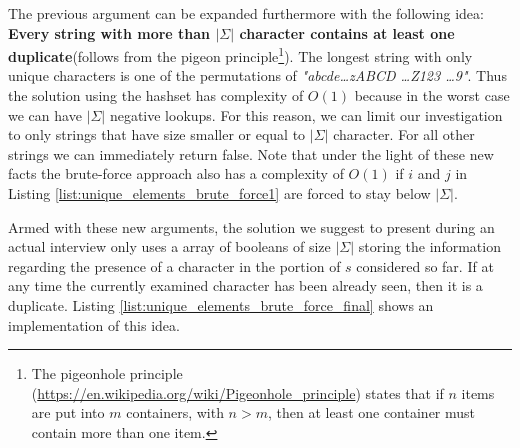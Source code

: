 The previous argument can be expanded furthermore with the following idea: \textbf{Every string
with more than $|\Sigma|$ character contains at least one duplicate}(follows from the pigeon
principle\footnote{The pigeonhole principle (\url{https://en.wikipedia.org/wiki/Pigeonhole_principle}) states that if $n$ items are put into $m$ containers, with
$n > m$, then at least one container must contain more than one item.}). 
The longest string with only unique characters is one of the permutations of \textit{"abcde\ldots zABCD \ldots Z123 \ldots 9"}.
Thus the solution using the hashset has complexity of $O(1)$ because in the worst case 
we can have $|\Sigma|$ negative lookups.
For this reason, we can limit our investigation to only strings that have size smaller or equal to
$|\Sigma|$ character. For all other strings we can immediately return false.
Note that under the light of these new facts the brute-force approach also has a complexity of $O(1)$
if $i$ and $j$ in Listing \ref{list:unique_elements_brute_force1} are forced to stay below
$|\Sigma|$.

Armed with these new arguments, the solution we suggest to present during an actual interview only uses a
array of booleans of size $|\Sigma|$ storing the information regarding the presence of a
character in the portion of $s$ considered so far.
If at any time the currently examined character has
been already seen, then it is a duplicate.
Listing \ref{list:unique_elements_brute_force_final} shows an implementation of this idea.



